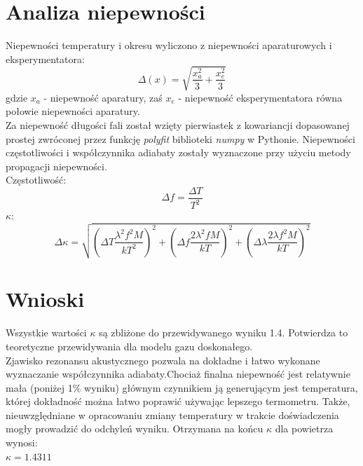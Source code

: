 \documentclass[a4paper,10pt]{article}
\begin{document}
\section{Analiza niepewności}
Niepewności temperatury i okresu wyliczono z niepewności aparaturowych i eksperymentatora:\\
\begin{equation}
  \Delta(x) = \sqrt{\frac{x_a^2}{3}+\frac{x_e^2}{3}}
\end{equation}
gdzie $x_a$ - niepewność aparatury, zaś $x_e$ - niepewność eksperymentatora równa połowie niepewności aparatury.\\
Za niepewność długości fali został wzięty pierwiastek z kowariancji dopasowanej prostej zwróconej przez funkcję \emph{polyfit} biblioteki \emph{numpy} w Pythonie.
Niepewności częstotliwości i współczynnika adiabaty zostały wyznaczone przy użyciu metody propagacji niepewności.\\
Częstotliwość:
\begin{equation}
  \Delta f = \frac{\Delta T}{T^2}
\end{equation}
$\kappa$:
\begin{equation}
  \Delta \kappa = \sqrt{(\Delta T \frac{\lambda^2 f^2 M}{kT^2})^2+(\Delta f \frac{2\lambda^2 f M}{kT})^2+(\Delta \lambda \frac{2\lambda f^2 M}{kT})^2}
\end{equation}

\section{Wnioski}
Wszystkie wartości $\kappa$ są zbliżone do przewidywanego wyniku 1.4. Potwierdza to teoretyczne przewidywania dla modelu gazu doskonałego.
\\
Zjawisko rezonansu akustycznego pozwala na dokładne i łatwo wykonane wyznaczanie współczynnika adiabaty.Chociaż finalna niepewność jest relatywnie mała (poniżej 1\% wyniku) głównym czynnikiem ją generującym jest temperatura, której dokładność można łatwo poprawić używając lepszego termometru. Także, nieuwzględniane w opracowaniu zmiany temperatury w trakcie doświadczenia mogły prowadzić do odchyleń wyniku. Otrzymana na końcu $\kappa$ dla powietrza wynosi:
\\ $\kappa = 1.4311$\\
\end{document}

